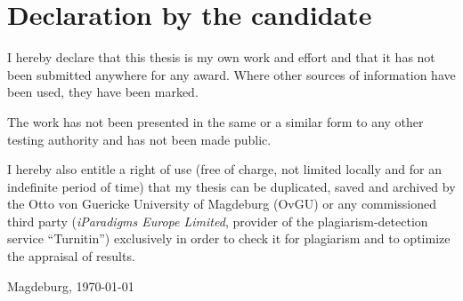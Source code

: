 %
%

\section*{Declaration by the candidate}

I hereby declare that this thesis is my own work and effort and that it has not 
been submitted anywhere for any award. Where other sources of information have 
been used, they have been marked.

\bigskip

The work has not been presented in the same or a similar form to any other testing authority and has not been made public.

\bigskip

I hereby also entitle a right of use (free of charge, not limited locally and for an indefinite period of time) that my thesis can be duplicated, saved and archived by the Otto von Guericke University of Magdeburg (OvGU) or any commissioned third party (\eg \emph{iParadigms Europe Limited}, provider of the plagiarism-detection service \enquote{Turnitin}) exclusively in order to check it for plagiarism and to optimize the appraisal of results.

\bigskip

Magdeburg, \today

